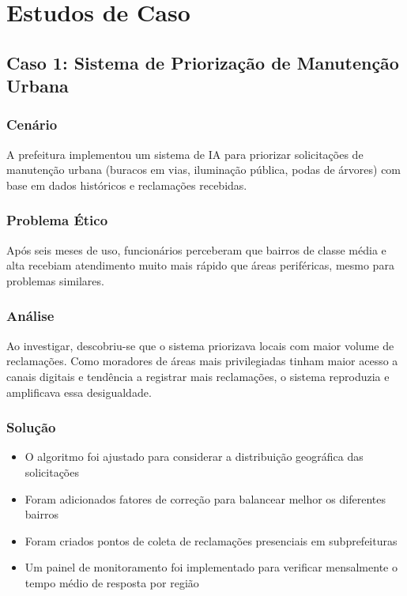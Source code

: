\documentclass[12pt,a4paper]{article}
\begin{document}
\newpage
\section{Estudos de Caso}

\subsection{Caso 1: Sistema de Priorização de Manutenção Urbana}

\subsubsection{Cenário}
A prefeitura implementou um sistema de IA para priorizar solicitações de manutenção urbana (buracos em vias, iluminação pública, podas de árvores) com base em dados históricos e reclamações recebidas.

\subsubsection{Problema Ético}
Após seis meses de uso, funcionários perceberam que bairros de classe média e alta recebiam atendimento muito mais rápido que áreas periféricas, mesmo para problemas similares.

\subsubsection{Análise}
Ao investigar, descobriu-se que o sistema priorizava locais com maior volume de reclamações. Como moradores de áreas mais privilegiadas tinham maior acesso a canais digitais e tendência a registrar mais reclamações, o sistema reproduzia e amplificava essa desigualdade.

\subsubsection{Solução}
\begin{itemize}
    \item O algoritmo foi ajustado para considerar a distribuição geográfica das solicitações
    \item Foram adicionados fatores de correção para balancear melhor os diferentes bairros
    \item Foram criados pontos de coleta de reclamações presenciais em subprefeituras
    \item Um painel de monitoramento foi implementado para verificar mensalmente o tempo médio de resposta por região
\end{itemize}
\end{document}
